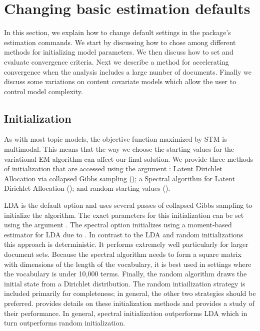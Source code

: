 \documentclass[article,shortnames]{jss}
\begin{document}
\section{Changing basic estimation defaults}
\label{sec:defaults}

In this section, we explain how to change default settings in the  package's estimation commands.  We start by discussing how to chose among different methods for initializing model parameters.  We then discuss how to set and evaluate convergence criteria.  Next we describe a method for accelerating convergence when the analysis includes a large number of documents. Finally we discuss some variations on content covariate models which allow the user to control model complexity.

\subsection{Initialization}
\label{sec:init}
As with most topic models, the objective function maximized by STM is multimodal.  This means that the way we choose the starting values for the variational EM algorithm can affect our final solution.  We provide three methods of initialization that are accessed using the argument : Latent Dirichlet Allocation via collapsed Gibbs sampling (); a Spectral algorithm for Latent Dirichlet Allocation (); and random starting values ().

LDA is the default option and uses several passes of collapsed Gibbs sampling to initialize the algorithm. The exact parameters for this initialization can be set using the argument . The spectral option initializes using a moment-based estimator for LDA due to \citet{arora2012practical}. In contrast to the LDA and random initializations this approach is deterministic.  It performs extremely well particularly for larger document sets.  Because the spectral algorithm needs to form a square matrix with dimensions of the length of the vocabulary, it is best used in settings where the vocabulary is under 10,000 terms.  Finally, the random algorithm draws the initial state from a Dirichlet distribution.  The random intiailization strategy is included primarily for completeness; in general, the other two strategies should be preferred.  \citet{chaptermulti} provides details on these initialization methods and provides a study of their performance.  In general, spectral initialization outperforms LDA which in turn outperforms random initialization.
\end{document}
